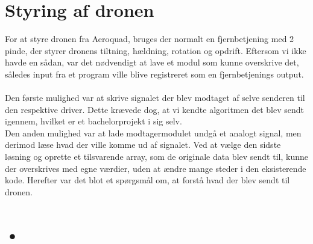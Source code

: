 \documentclass[Main]{subfiles}
\begin{document}
\section{Styring af dronen}
For at styre dronen fra Aeroquad, bruges der normalt en fjernbetjening med 2 pinde, der styrer dronens tiltning, hældning, rotation og opdrift.
Eftersom vi ikke havde en sådan, var det nødvendigt at lave et modul som kunne overskrive det, således input fra et program ville blive registreret som en fjernbetjenings output.
\\
\\
Den første mulighed var at skrive signalet der blev modtaget af selve senderen til den respektive driver. 
Dette krævede dog, at vi kendte algoritmen det blev sendt igennem, hvilket er et bachelorprojekt i sig selv.
\\
Den anden mulighed var at lade modtagermodulet undgå et analogt signal, men derimod læse hvad der ville komme ud af signalet.
Ved at vælge den sidste løsning og oprette et tilsvarende array, som de originale data blev sendt til, kunne der overskrives med egne værdier, uden at ændre mange steder i den eksisterende kode.
Herefter var det blot et spørgsmål om, at forstå hvad der blev sendt til dronen.


\section{•}
\end{document}
